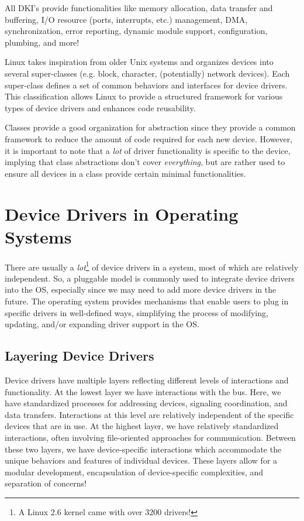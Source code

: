 \documentclass{report}
\newcommand{\exampleBegin}[1]{\begin{tcolorbox}[colback=blue!5!white,colframe=black!75!blue,title={Example:
      #1}]}
\newcommand{\exampleEnd}{\end{tcolorbox}}
\begin{document}
\exampleBegin{``You'll Never Find Someone Like Me''}
All DKI's provide functionalities like memory allocation, data transfer and buffering, I/O resource
(ports, interrupts, etc.) management, DMA, synchronization, error reporting, dynamic module support,
configuration, plumbing, and more!
\exampleEnd

\exampleBegin{Linux Device Driver Abstractions}
Linux takes inspiration from older Unix systems and organizes devices into several super-classes
(e.g. block, character, (potentially) network devices). Each super-class defines a set of common
behaviors and interfaces for device drivers. This classification allows Linux to provide a
structured framework for various types of device drivers and enhances code reusability.

Classes provide a good organization for abstraction since they provide a common framework to reduce
the amount of code required for each new device. However, it is important to note that a
\textit{lot} of driver functionality is specific to the device, implying that class abstractions
don't cover \textit{everything}, but are rather used to ensure all devices in a class provide
certain minimal functionalities.
\exampleEnd

\section{Device Drivers in Operating Systems}
There are usually a \textit{lot}\footnote{A Linux 2.6 kernel came with over 3200 drivers!} of device
drivers in a system, most of which are relatively independent. So, a pluggable model is commonly
used to integrate device drivers into the OS, especially since we may need to add more device
drivers in the future. The operating system provides mechanisms that enable users to plug in
specific drivers in well-defined ways, simplifying the process of modifying, updating, and/or
expanding driver support in the OS.


\subsection{Layering Device Drivers}
Device drivers have multiple layers reflecting different levels of interactions and
functionality. At the lowest layer we have interactions with the bus. Here, we have standardized
processes for addressing devices, signaling coordination, and data transfers. Interactions at this
level are relatively independent of the specific devices that are in use. At the highest layer, we
have relatively standardized interactions, often involving file-oriented approaches for
communication. Between these two layers, we have device-specific interactions which accommodate the
unique behaviors and features of individual devices. These layers allow for a modular development,
encapsulation of device-specific complexities, and separation of concerns!
\end{document}
